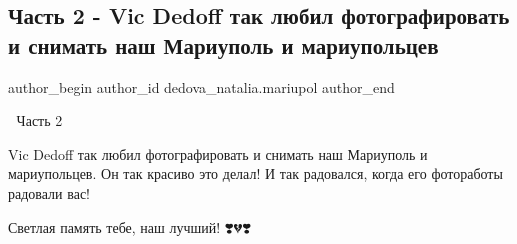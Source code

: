  
 
 
 
 

\subsection{Часть 2 - Vic Dedoff так любил фотографировать и снимать наш Мариуполь и мариупольцев}
\label{sec:18_04_2022.fb.dedova_natalia.mariupol.1.chast_2_vic_dedoff}

\ifcmt
 author_begin
   author_id dedova_natalia.mariupol
 author_end
\fi

🥀 Часть 2

Vic Dedoff так любил фотографировать и снимать наш Мариуполь и мариупольцев. Он
так красиво это делал! И так радовался, когда его фотоработы радовали вас! 

Светлая память тебе, наш лучший! ❣️💔❣️
